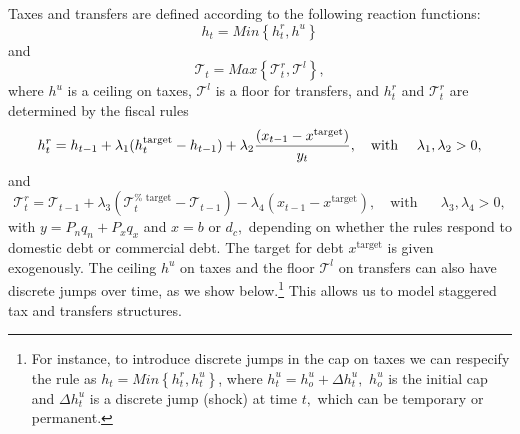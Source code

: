 \documentclass[11pt]{article}
\begin{document}
Taxes and transfers are defined according to the following reaction
functions:%
\begin{equation}
h_{t}=Min\left\{ h_{t}^{r},h^{u}\right\}  \label{hmin}
\end{equation}%
and%
\begin{equation}
\mathcal{T}_{t}=Max\left\{ \mathcal{T}_{t}^{r},\mathcal{T}^{l}\right\} ,
\label{Tmax}
\end{equation}%
where $h^{u}$ is a ceiling on taxes, $\mathcal{T}^{l}$ is a floor for
transfers, and $h_{t}^{r}$ and $\mathcal{T}_{t}^{r}$ are determined by the
fiscal rules%
\begin{equation}
h_{t}^{r}=h_{t-1}+\lambda _{1}({\small h}_{t}^{\text{target}%
}-h_{t-1})+\lambda _{2}\frac{(x_{t-1}-x^{\text{target}})}{y_{t}},\quad \text{%
with}\quad \text{ }\lambda _{1},\lambda _{2}>0,  \label{h_reaction}
\end{equation}%
and%
\begin{equation}
\mathcal{T}_{t}^{r}=\mathcal{T}_{t-1}+\lambda _{3}(\mathcal{T}_{t}^{\text{%
target}}-\mathcal{T}_{t-1})-\lambda _{4}(x_{t-1}-x^{\text{target}}),\quad 
\text{with}\quad \text{ }\lambda _{3},\lambda _{4}>0,  \label{T_reaction}
\end{equation}%
with $y=P_{n}q_{n}+P_{x}q_{x}$ and $x=b$ or $d_{c},$ depending on whether
the rules respond to domestic debt or commercial debt. The target for debt $%
x^{\text{target}}$ is given exogenously. The ceiling $h^{u}$ on taxes and
the floor $\mathcal{T}^{l}$ on transfers can also have discrete jumps over
time, as we show below.\footnote{%
For instance, to introduce discrete jumps in the cap on taxes we can
respecify the rule as $h_{t}=Min\left\{ h_{t}^{r},h_{t}^{u}\right\} $, where 
$h_{t}^{u}=h_{o}^{u}+\Delta h_{t}^{u},$ $h_{o}^{u}$ is the initial cap and $%
\Delta h_{t}^{u}$ is a discrete jump (shock) at time $t,$ which can be
temporary or permanent.} This allows us to model staggered tax and transfers
structures.
\end{document}
